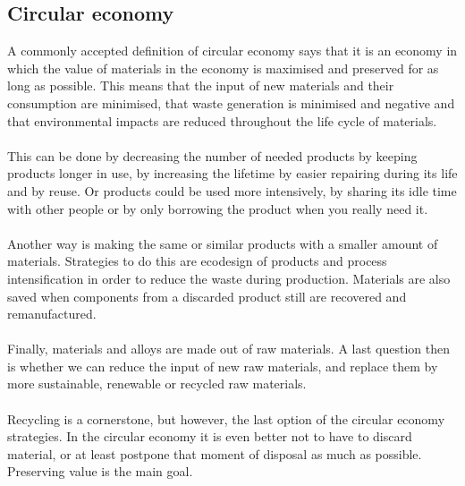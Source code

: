 \documentclass[../summary.tex]{subfiles}
\begin{document}
	\subsection{Circular economy}
	
	A commonly accepted definition of circular economy says that it is an economy in which the value of materials in the economy is maximised and preserved for as long as possible. This means that the input of new materials and their consumption are minimised, that waste generation is minimised and negative and that environmental impacts are reduced throughout the life cycle of materials. 
	\\\\
	This can be done by decreasing the number of needed products by keeping products longer in use, by increasing the lifetime by easier repairing during its life and by reuse. Or products could be used more intensively, by sharing its idle time with other people or by only borrowing the product when you really need it.
	\\\\
	Another way is making the same or similar products with a smaller amount of materials. Strategies to do this are ecodesign of products and process intensification in order to reduce the waste during production. Materials are also saved when components from a discarded product still are recovered and remanufactured.
	\\\\
	Finally, materials and alloys are made out of raw materials. A last question then is whether we can reduce the input of new raw materials, and replace them by more sustainable, renewable or recycled raw materials. 
	\\\\
	Recycling is a cornerstone, but however, the last option of the circular economy strategies. In the circular economy it is even better not to have to discard material, or at least postpone that moment of disposal as much as possible. Preserving value is the main goal.
	
\end{document}
